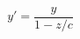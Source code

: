\documentclass{article}
\begin{document}
\thispagestyle{empty}

$$
y' = \frac{y}{1-z/c}
$$
\end{document}
